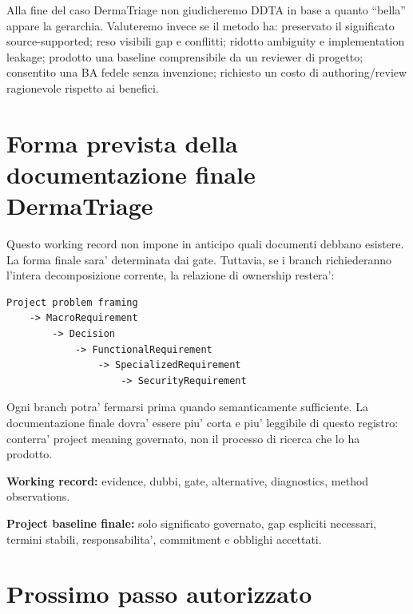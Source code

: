 \documentclass[11pt,a4paper]{article}
\begin{document}
\begin{ddtaworking}[title={Criterio per la valutazione finale della metodologia}]
Alla fine del caso DermaTriage non giudicheremo DDTA in base a quanto ``bella'' appare la gerarchia. Valuteremo invece se il metodo ha: preservato il significato source-supported; reso visibili gap e conflitti; ridotto ambiguity e implementation leakage; prodotto una baseline comprensibile da un reviewer di progetto; consentito una BA fedele senza invenzione; richiesto un costo di authoring/review ragionevole rispetto ai benefici.
\end{ddtaworking}

\section{Forma prevista della documentazione finale DermaTriage}

Questo working record non impone in anticipo quali documenti debbano esistere. La forma finale sara' determinata dai gate. Tuttavia, se i branch richiederanno l'intera decomposizione corrente, la relazione di ownership restera':

\begin{lstlisting}
Project problem framing
    -> MacroRequirement
        -> Decision
            -> FunctionalRequirement
                -> SpecializedRequirement
                    -> SecurityRequirement
\end{lstlisting}

Ogni branch potra' fermarsi prima quando semanticamente sufficiente. La documentazione finale dovra' essere piu' corta e piu' leggibile di questo registro: conterra' project meaning governato, non il processo di ricerca che lo ha prodotto.

\begin{ddtaprinciple}[title={Working record vs project baseline}]
\textbf{Working record:} evidence, dubbi, gate, alternative, diagnostics, method observations.\par
\textbf{Project baseline finale:} solo significato governato, gap espliciti necessari, termini stabili, responsabilita', commitment e obblighi accettati.
\end{ddtaprinciple}

\section{Prossimo passo autorizzato}
\end{document}
